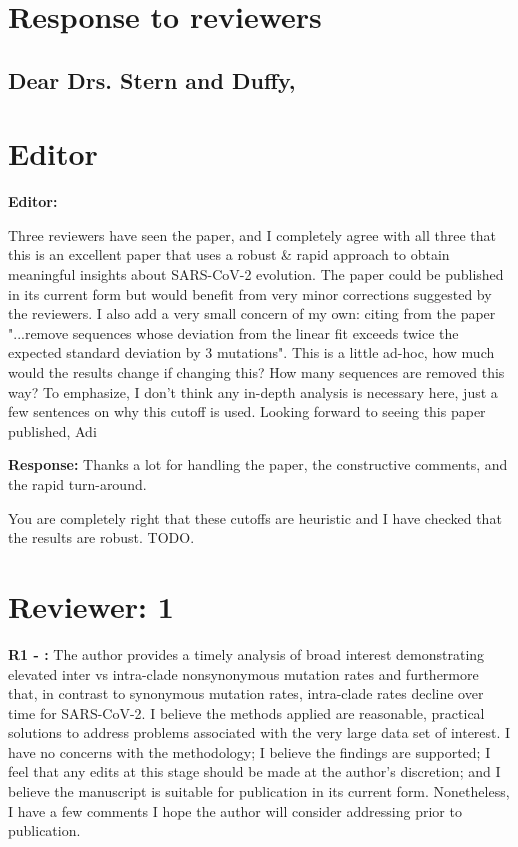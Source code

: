 \documentclass[aps,rmp,onecolumn]{revtex4-1}
\newcounter{counter1}[section]
\newcounter{counter2}[section]
\newcounter{counter3}[section]
\newcommand{\refa}[1]{\vskip 5mm \textbf{R1 - \stepcounter{counter1}\arabic{counter1}:} #1}
\newcommand{\editor}[1]{\textbf{Editor:} #1\vskip 5mm}
\newcommand{\response}[1]{{\it {\color{response}\textbf{Response:} #1}}\vskip 5mm}
\begin{document}
\section*{Response to reviewers}

\subsection*{Dear Drs. Stern and Duffy,}

\section*{Editor}

\editor{

Three reviewers have seen the paper, and I completely agree with all three that this is an excellent paper that uses a robust & rapid approach to obtain meaningful insights about SARS-CoV-2 evolution. The paper could be published in its current form but would benefit from very minor corrections suggested by the reviewers.
I also add a very small concern of my own: citing from the paper "...remove sequences whose deviation from the linear fit exceeds twice the expected standard deviation by 3 mutations". This is a little ad-hoc, how much would the results change if changing this? How many sequences are removed this way? To emphasize, I don't think any in-depth analysis is necessary here, just a few sentences on why this cutoff is used.
Looking forward to seeing this paper published,
Adi
}

\response{Thanks a lot for handling the paper, the constructive comments, and the rapid turn-around.

You are completely right that these cutoffs are heuristic and I have checked that the results are robust.
TODO.
}

\section*{Reviewer: 1}

\refa{
The author provides a timely analysis of broad interest demonstrating elevated inter vs intra-clade nonsynonymous mutation rates and furthermore that, in contrast to synonymous mutation rates, intra-clade rates decline over time for SARS-CoV-2. I believe the methods applied are reasonable, practical solutions to address problems associated with the very large data set of interest. I have no concerns with the methodology; I believe the findings are supported; I feel that any edits at this stage should be made at the author's discretion; and I believe the manuscript is suitable for publication in its current form. Nonetheless, I have a few comments I hope the author will consider addressing prior to publication.}
\end{document}
